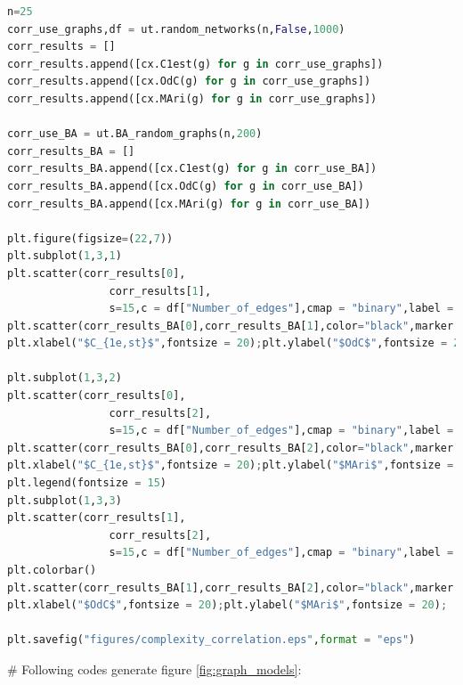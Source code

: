 \documentclass[12pt]{article}
\begin{document}
\begin{lstlisting}[breaklines=true,language=Python]
n=25
corr_use_graphs,df = ut.random_networks(n,False,1000)
corr_results = []
corr_results.append([cx.C1est(g) for g in corr_use_graphs])
corr_results.append([cx.OdC(g) for g in corr_use_graphs])
corr_results.append([cx.MAri(g) for g in corr_use_graphs])

corr_use_BA = ut.BA_random_graphs(n,200)
corr_results_BA = []
corr_results_BA.append([cx.C1est(g) for g in corr_use_BA])
corr_results_BA.append([cx.OdC(g) for g in corr_use_BA])
corr_results_BA.append([cx.MAri(g) for g in corr_use_BA])

plt.figure(figsize=(22,7))
plt.subplot(1,3,1)
plt.scatter(corr_results[0],
                corr_results[1],
                s=15,c = df["Number_of_edges"],cmap = "binary",label = "$G(n,m)$ random graphs")
plt.scatter(corr_results_BA[0],corr_results_BA[1],color="black",marker = "x",label = "BA Graphs")
plt.xlabel("$C_{1e,st}$",fontsize = 20);plt.ylabel("$OdC$",fontsize = 20);

plt.subplot(1,3,2)
plt.scatter(corr_results[0],
                corr_results[2],
                s=15,c = df["Number_of_edges"],cmap = "binary",label = "$G(n,m)$ random graphs")
plt.scatter(corr_results_BA[0],corr_results_BA[2],color="black",marker = "x",label = "BA Graphs")
plt.xlabel("$C_{1e,st}$",fontsize = 20);plt.ylabel("$MAri$",fontsize = 20);
plt.legend(fontsize = 15)
plt.subplot(1,3,3)
plt.scatter(corr_results[1],
                corr_results[2],
                s=15,c = df["Number_of_edges"],cmap = "binary",label = "$G(n,m)$ random graphs")
plt.colorbar()
plt.scatter(corr_results_BA[1],corr_results_BA[2],color="black",marker = "x",label = "BA Graphs")
plt.xlabel("$OdC$",fontsize = 20);plt.ylabel("$MAri$",fontsize = 20);

plt.savefig("figures/complexity_correlation.eps",format = "eps")
\end{lstlisting}
\noindent
\newline
\# Following codes generate figure \ref{fig:graph_models}:
\end{document}
